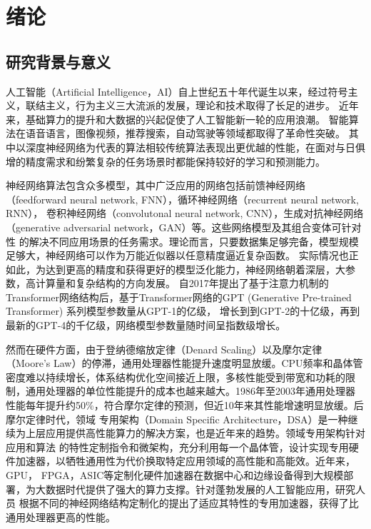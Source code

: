 \chapter{绪\hspace{6pt}论}

\section{研究背景与意义}
人工智能（Artificial Intelligence，AI）自上世纪五十年代诞生以来，经过符号主义，联结主义，行为主义三大流派的发展，理论和技术取得了长足的进步。
近年来，基础算力的提升和大数据的兴起促使了人工智能新一轮的应用浪潮。
智能算法在语音语言，图像视频，推荐搜索，自动驾驶等领域都取得了革命性突破。
其中以深度神经网络为代表的算法相较传统算法表现出更优越的性能，在面对与日俱增的精度需求和纷繁复杂的任务场景时都能保持较好的学习和预测能力。

神经网络算法包含众多模型，其中广泛应用的网络包括前馈神经网络（feedforward neural network, FNN），循环神经网络（recurrent neural network, RNN），
卷积神经网络（convolutonal neural network, CNN），生成对抗神经网络（generative adversarial network，GAN）等。这些网络模型及其组合变体可针对性
的解决不同应用场景的任务需求。理论而言，只要数据集足够完备，模型规模足够大，神经网络可以作为万能近似器以任意精度逼近复杂函数。
实际情况也正如此，为达到更高的精度和获得更好的模型泛化能力，神经网络朝着深层，大参数，高计算量和复杂结构的方向发展。
自2017年提出了基于注意力机制的Transformer网络结构后，基于Transformer网络的GPT (Generative Pre-trained Transformer) 系列模型参数量从GPT-1的亿级，
增长到到GPT-2的十亿级，再到最新的GPT-4的千亿级，网络模型参数量随时间呈指数级增长。

然而在硬件方面，由于登纳德缩放定律（Denard Scaling）以及摩尔定律（Moore's Law）的停滞，通用处理器性能提升速度明显放缓。CPU频率和晶体管
密度难以持续增长，体系结构优化空间接近上限，多核性能受到带宽和功耗的限制，通用处理器的单位性能提升的成本也越来越大。1986年至2003年通用处理器
性能每年提升约50\%，符合摩尔定律的预测，但近10年来其性能增速明显放缓。后摩尔定律时代，领域
专用架构（Domain Specific Architecture，DSA）是一种继续为上层应用提供高性能算力的解决方案，也是近年来的趋势。领域专用架构针对应用和算法
的特性定制指令和微架构，充分利用每一个晶体管，设计实现专用硬件加速器，以牺牲通用性为代价换取特定应用领域的高性能和高能效。近年来，GPU，
FPGA，ASIC等定制化硬件加速器在数据中心和边缘设备得到大规模部署，为大数据时代提供了强大的算力支撑。针对蓬勃发展的人工智能应用，研究人员
根据不同的神经网络结构定制化的提出了适应其特性的专用加速器，获得了比通用处理器更高的性能。

